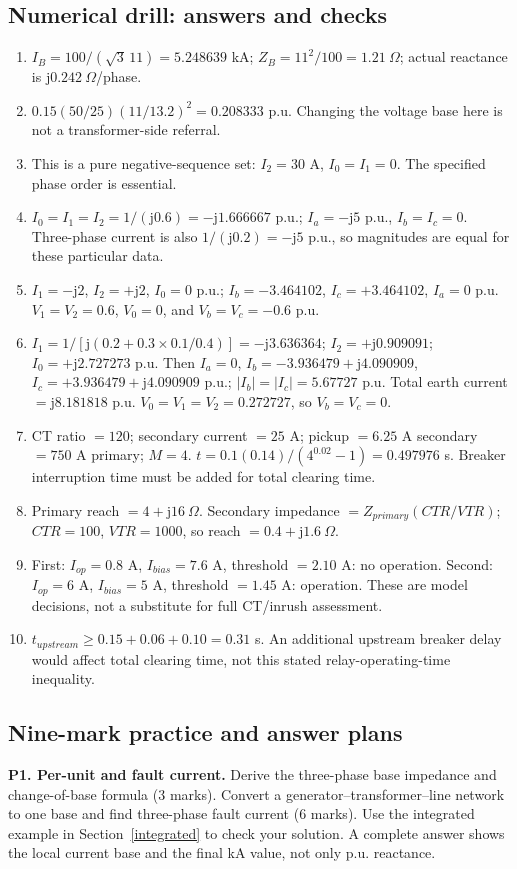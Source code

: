 \documentclass[11pt,a4paper]{article}
\newcommand{\jj}{\mathrm j}
\begin{document}
\subsection{Numerical drill: answers and checks}
\begin{enumerate}[label=\textbf{N\arabic*.}]
\item $I_B=100/(\sqrt3\,11)=5.248639$ kA; $Z_B=11^2/100=1.21\ \Omega$; actual reactance is $\jj0.242\ \Omega$/phase.
\item $0.15(50/25)(11/13.2)^2=0.208333$ p.u. Changing the voltage base here is not a transformer-side referral.
\item This is a pure negative-sequence set: $I_2=30$ A, $I_0=I_1=0$. The specified phase order is essential.
\item $I_0=I_1=I_2=1/(\jj0.6)=-\jj1.666667$ p.u.; $I_a=-\jj5$ p.u., $I_b=I_c=0$. Three-phase current is also $1/(\jj0.2)=-\jj5$ p.u., so magnitudes are equal for these particular data.
\item $I_1=-\jj2$, $I_2=+\jj2$, $I_0=0$ p.u.; $I_b=-3.464102$, $I_c=+3.464102$, $I_a=0$ p.u. $V_1=V_2=0.6$, $V_0=0$, and $V_b=V_c=-0.6$ p.u.
\item $I_1=1/[\jj(0.2+0.3\times0.1/0.4)]=-\jj3.636364$; $I_2=+\jj0.909091$; $I_0=+\jj2.727273$ p.u. Then $I_a=0$, $I_b=-3.936479+\jj4.090909$, $I_c=+3.936479+\jj4.090909$ p.u.; $|I_b|=|I_c|=5.67727$ p.u. Total earth current $=\jj8.181818$ p.u. $V_0=V_1=V_2=0.272727$, so $V_b=V_c=0$.
\item CT ratio $=120$; secondary current $=25$ A; pickup $=6.25$ A secondary $=750$ A primary; $M=4$. $t=0.1(0.14)/(4^{0.02}-1)=0.497976$ s. Breaker interruption time must be added for total clearing time.
\item Primary reach $=4+\jj16\ \Omega$. Secondary impedance $=Z_{primary}(CTR/VTR)$; $CTR=100$, $VTR=1000$, so reach $=0.4+\jj1.6\ \Omega$.
\item First: $I_{op}=0.8$ A, $I_{bias}=7.6$ A, threshold $=2.10$ A: no operation. Second: $I_{op}=6$ A, $I_{bias}=5$ A, threshold $=1.45$ A: operation. These are model decisions, not a substitute for full CT/inrush assessment.
\item $t_{upstream}\ge0.15+0.06+0.10=0.31$ s. An additional upstream breaker delay would affect total clearing time, not this stated relay-operating-time inequality.
\end{enumerate}
\subsection{Nine-mark practice and answer plans}
\textbf{P1. Per-unit and fault current.} Derive the three-phase base impedance and change-of-base formula (3 marks). Convert a generator--transformer--line network to one base and find three-phase fault current (6 marks). Use the integrated example in Section~\ref{integrated} to check your solution. A complete answer shows the local current base and the final kA value, not only p.u. reactance.
\end{document}

